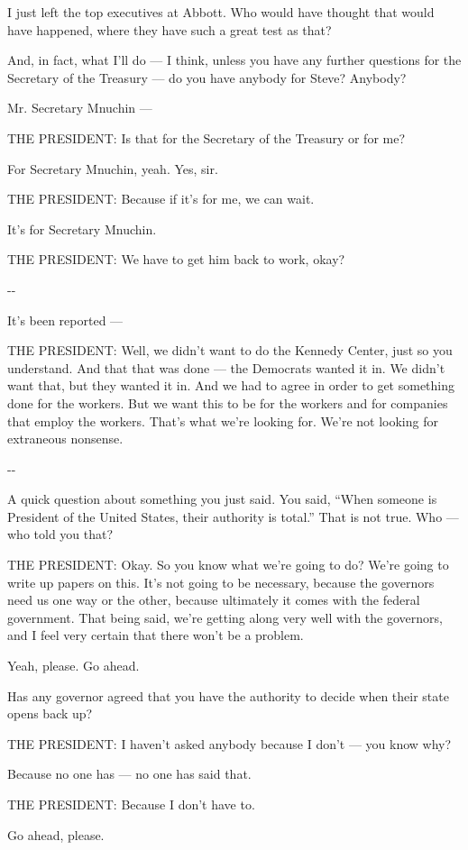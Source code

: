 I just left the top executives at Abbott. Who would have thought that
would have happened, where they have such a great test as that?

And, in fact, what I'll do --- I think, unless you have any further
questions for the Secretary of the Treasury --- do you have anybody for
Steve? Anybody?

Mr. Secretary Mnuchin ---

THE PRESIDENT: Is that for the Secretary of the Treasury or for me?

For Secretary Mnuchin, yeah. Yes, sir.

THE PRESIDENT: Because if it's for me, we can wait.

It's for Secretary Mnuchin.

THE PRESIDENT: We have to get him back to work, okay?

-\/-

It's been reported ---

THE PRESIDENT: Well, we didn't want to do the Kennedy Center, just so
you understand. And that that was done --- the Democrats wanted it in.
We didn't want that, but they wanted it in. And we had to agree in order
to get something done for the workers. But we want this to be for the
workers and for companies that employ the workers. That's what we're
looking for. We're not looking for extraneous nonsense.

-\/-

A quick question about something you just said. You said, ``When someone
is President of the United States, their authority is total.'' That is
not true. Who --- who told you that?

THE PRESIDENT: Okay. So you know what we're going to do? We're going to
write up papers on this. It's not going to be necessary, because the
governors need us one way or the other, because ultimately it comes with
the federal government. That being said, we're getting along very well
with the governors, and I feel very certain that there won't be a
problem.

Yeah, please. Go ahead.

Has any governor agreed that you have the authority to decide when their
state opens back up?

THE PRESIDENT: I haven't asked anybody because I don't --- you know why?

Because no one has --- no one has said that.

THE PRESIDENT: Because I don't have to.

Go ahead, please.

